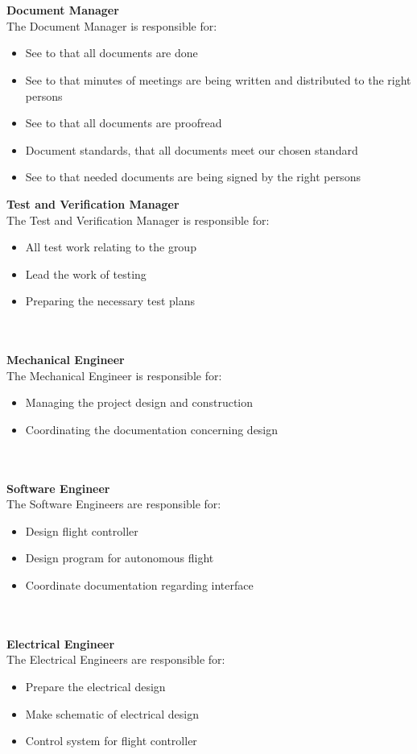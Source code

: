 \\\\
\textbf{Document Manager}\\
The Document Manager is responsible for:
\begin{itemize}
  \item See to that all documents are done
  \item See to that minutes of meetings are being written and distributed to the right persons
  \item See to that all documents are proofread
  \item Document standards, that all documents meet our chosen standard 
  \item See to that needed documents are being signed by the right persons 
\end{itemize}
\newpage
\noindent\textbf{Test and Verification Manager}\\
The Test and Verification Manager is responsible for:
\begin{itemize}
  \item All test work relating to the group 
  \item Lead the work of testing
  \item Preparing the necessary test plans
\end{itemize}
\\\\
\textbf{Mechanical Engineer}\\
The Mechanical Engineer is responsible for:
\begin{itemize}
  \item Managing the project design and construction
  \item Coordinating the documentation concerning design 
\end{itemize}
\\\\
\textbf{Software Engineer}\\
The Software Engineers are responsible for: 
\begin{itemize}
  \item Design flight controller
  \item Design program for autonomous flight 
  \item Coordinate documentation regarding interface
\end{itemize}
\\\\
\textbf{Electrical Engineer}\\
The Electrical Engineers are responsible for:
\begin{itemize}
  \item Prepare the electrical design 
  \item Make schematic of electrical design 
  \item Control system for flight controller
\end{itemize}

